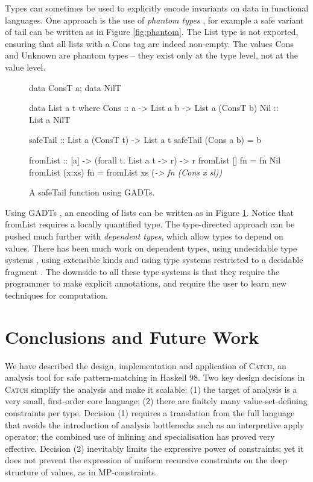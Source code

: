 \documentclass[preprint]{sigplanconf}
\newcommand{\C}[1]{\textsf{#1}}
\newcommand{\catch}{\textsc{Catch}}
\newcommand{\ignore}{}
\begin{document}
Types can sometimes be used to explicitly encode invariants on data in functional languages. One approach is the use of \textit{phantom types} \citep{fluet:phantom}, for example a safe variant of \C{tail} can be written as in Figure \ref{fig:phantom}. The \C{List} type is not exported, ensuring that all lists with a \C{Cons} tag are indeed non-empty. The values \C{Cons} and \C{Unknown} are phantom types -- they exist only at the type level, not at the value level.

\begin{figure}
\ignore\begin{code}
data ConsT a; data NilT

data List a t where
    Cons  :: a -> List a b -> List a (ConsT b)
    Nil   :: List a NilT

safeTail :: List a (ConsT t) -> List a t
safeTail (Cons a b) = b

fromList :: [a] -> (forall t. List a t -> r) -> r
fromList []      fn = fn Nil
fromList (x:xs)  fn = fromList xs (\sl -> fn (Cons x sl))
\end{code}
\caption{A \C{safeTail} function using GADTs.}
\label{fig:gadt}
\end{figure}

Using GADTs \citep{spj:gadt}, an encoding of lists can be written as in Figure \ref{fig:gadt}. Notice that \C{fromList} requires a locally quantified type. The type-directed approach can be pushed much further with \textit{dependent types}, which allow types to depend on values. There has been much work on dependent types, using undecidable type systems \citep{epigram}, using extensible kinds \citep{omega} and using type systems restricted to a decidable fragment \citep{xi:dependent_practical}. The downside to all these type systems is that they require the programmer to make explicit annotations, and require the user to learn new techniques for computation.


\section{Conclusions and Future Work}
\label{sec:conclusion}

We have described the design, implementation and application of \catch{},
an analysis tool for safe pattern-matching in Haskell 98.  Two key
design decisions in \catch{} simplify the analysis and make it scalable:
(1) the target of analysis is a very small, first-order core language;
(2) there are finitely many value-set-defining constraints per type.
Decision (1) requires a translation from the full language that avoids
the introduction of analysis bottlenecks such as an interpretive \C{apply}
operator; the combined use of inlining and specialisation has proved
very effective.  Decision (2) inevitably limits the expressive power of
constraints; yet it does not prevent the expression of uniform recursive
constraints on the deep structure of values, as in MP-constraints.
\end{document}
